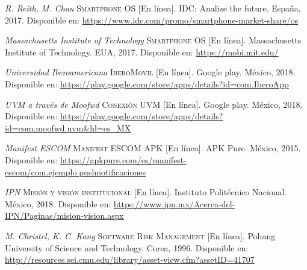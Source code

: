 \begin{thebibliography}{X}
		\textit{R. Reith, M. Chau}
		\textsc{Smartphone OS} [En línea].
		IDC: Analize the future. España, 2017. 
		\newline
		Disponible en: 
		\url{https://www.idc.com/promo/smartphone-market-share/os}

		\textit{Massachusetts Institute of Technology}
		\textsc{Smartphone OS} [En línea].
		Massachusetts Institute of Technology. EUA, 2017. 
		\newline
		Disponible en: 
		\url{https://mobi.mit.edu/}

		\textit{Universidad Iberoamericana}
		\textsc{IberoMovil} [En línea].
		Google play. México, 2018. 
		\newline
		Disponible en: 
		\url{https://play.google.com/store/apps/details?id=com.IberoApp}

		\textit{UVM a través de Moofwd}
		\textsc{Conexión UVM} [En línea].
		Google play. México, 2018. 
		\newline
		Disponible en: 
		\url{https://play.google.com/store/apps/details?id=com.moofwd.uvm&hl=es_MX}

		\textit{Manifest ESCOM}
		\textsc{Manifest ESCOM APK} [En línea].
		APK Pure. México, 2015. 
		\newline
		Disponible en: 
		\url{https://apkpure.com/es/manifest-escom/com.ejemplo.pushnotificaciones}

		\textit{IPN}
		\textsc{Misión y visión institucional} [En línea]. 
		Instituto Politécnico Nacional. México, 2018.
		\newline
		Disponible en: 
		\url{https://www.ipn.mx/Acerca-del-IPN/Paginas/mision-vision.aspx}

		\textit{M. Christel, K. C. Kang}
		\textsc{Software Risk Management} [En línea]. 
		Pohang University of Science and Technology. Corea, 1996.
		\newline
		Disponible en: 
		\url{http://resources.sei.cmu.edu/library/asset-view.cfm?assetID=41707}

\end{thebibliography}

